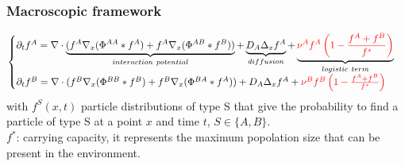 \documentclass[10pt]{beamer}
\newcommand\ka{\kappa}
\def \p {{\partial}}
\def \nucST {{\nu_c^{ST}}}
\def \nudST {{\nu_d^{ST}}}
\def \KST {{\kappa^{ST}}}
\newcommand\Fontvii{\fontsize{9}{7.2}\selectfont}
\begin{document}
\begin{frame}
\frametitle{Macroscopic framework}
\Fontvii
	\begin{equation}
\begin{cases}
\p_t f^{A}=  \nabla \cdot \underbrace{(f^A\nabla_x(\Phi^{AA}* f^A) + f^A \nabla_x( \Phi^{AB}*f^B))}_{interaction \ potential} + \underbrace{ D_A \Delta_x f^A}_{diffusion} + \underbrace{ \textcolor{red}{\nu^{A}f^A\left( 1-\frac{f^A+f^B}{f^{*}} \right)}}_{logistic \ term} \\

\p_t f^{B}=  \nabla \cdot (f^B\nabla_x(\Phi^{BB}* f^B) + f^B \nabla_x (\Phi^{BA}*f^A)) + D_A \Delta_x f^A + \textcolor{red}{\nu^{B}f^B\left( 1-\frac{f^A+f^B}{f^{*}} \right)}
\end{cases}
\end{equation}
with  $f^{S}(x,t)$ particle distributions of type S that give the probability to find a particle of type S at a point $x$ and time $t$, $S \in \{ A,B \}$. \\
 $f^*$: carrying capacity, it represents the maximum popolation size that can be present in the environment.

\end{frame}




\end{document}
